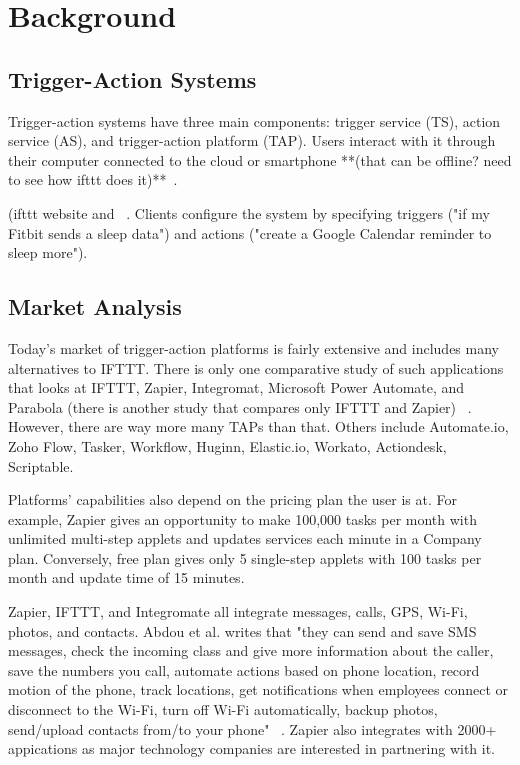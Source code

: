 \section{Background}
\label{sec:background}

\subsection{Trigger-Action Systems}

Trigger-action systems have three main components: trigger service (TS), action service (AS), and
trigger-action platform (TAP). Users interact with it through their computer connected to the cloud or
smartphone **(that can be offline? need to see how ifttt does it)**~\cite{DBLP:conf/sp/ChenCWSCF21}.

(ifttt website and ~\cite{DBLP:conf/spChenCWSCF21}. Clients configure the system by specifying triggers ("if my Fitbit sends a sleep data")
and actions ("create a Google Calendar reminder to sleep more"). 

\subsection{Market Analysis}
Today's market of trigger-action platforms is fairly extensive and includes many alternatives to IFTTT.
There is only one comparative study of such applications that looks at IFTTT, Zapier, Integromat,
Microsoft Power Automate, and Parabola (there is another study that compares only IFTTT and Zapier)
~\cite{DBLP:conf/icict2/AbdouEF21}. However, there are way more many TAPs than that. Others include
Automate.io, Zoho Flow, Tasker, Workflow, Huginn, Elastic.io,
Workato, Actiondesk, Scriptable. 

Platforms' capabilities also depend on the pricing plan the user is at. For example, Zapier gives an
opportunity to make 100,000 tasks per month with unlimited multi-step applets and updates services
each minute in a Company plan. Conversely, free plan gives only 5 single-step applets with 100 tasks
per month and update time of 15 minutes. 

Zapier, IFTTT, and Integromate all integrate messages, calls, GPS, Wi-Fi, photos, and contacts. Abdou
et al. writes that "they can send and save SMS messages, check the incoming class and give more
information about the caller, save the numbers you call, automate actions based on phone location,
record motion of the phone, track locations, get notifications when employees connect or disconnect to
the Wi-Fi, turn off Wi-Fi automatically, backup photos, send/upload contacts from/to your phone"
~\cite{DBLP:conf/icict2/AbdouEF21}. Zapier also integrates with 2000+ appications as major technology
companies are interested in partnering with it. 

